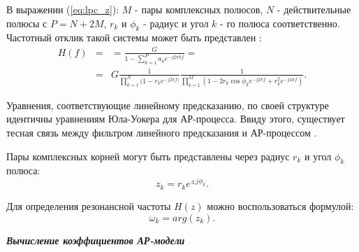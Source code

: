 В выражении (\ref{eq:lpc_z}): ${M}$ - пары комплексных полюсов, ${N}$ - действительные полюсы с ${P=N+2M}$,
${r_k}$ и ${\phi_k}$ - радиус и угол ${k}$ - го полюса соответственно. Частотный отклик такой системы 
может быть представлен \cite{saeed_book}:
\begin{eqnarray}
	\label{eq:lpc_freq_resp}
		H(f)	& = & = \frac{G}{1 - \sum \limits_{k=1}^P a_k e^{-j2 \pi kf}} =  \nonumber \\
			& = & G\frac{1}{\prod \limits_{k=1}^N (1-r_k e^{-j2 \pi f)}} \frac{1}{\prod \limits_{k=1}^M (1-2r_k \cos \phi_k e^{-j2 \pi f} + r_k^2 e^{-j4 \pi f})}.
\end{eqnarray}

Уравнения, соответствующие линейному предсказанию, по своей структуре идентичны уравнениям Юла-Уокера для АР-процесса.
Ввиду этого, существует тесная связь между фильтром линейного предсказания и АР-процессом \cite{marpl_book}.

Пары комплексных корней могут быть представлены через радиус ${r_k}$ и угол ${\phi_k}$ полюса:
\begin{equation}
	\label{eq:lpc_poles}
	z_k = r_k e^{\pm j \phi_k}.
\end{equation}

Для определения резонансной частоты ${H(z)}$ можно воспользоваться формулой:
\begin{equation}
	\label{eq:lpc_poles_freq}
	\omega_k = arg(z_k).
\end{equation}


{\bf{\textit{Вычисление коэффициентов АР-модели}}}

